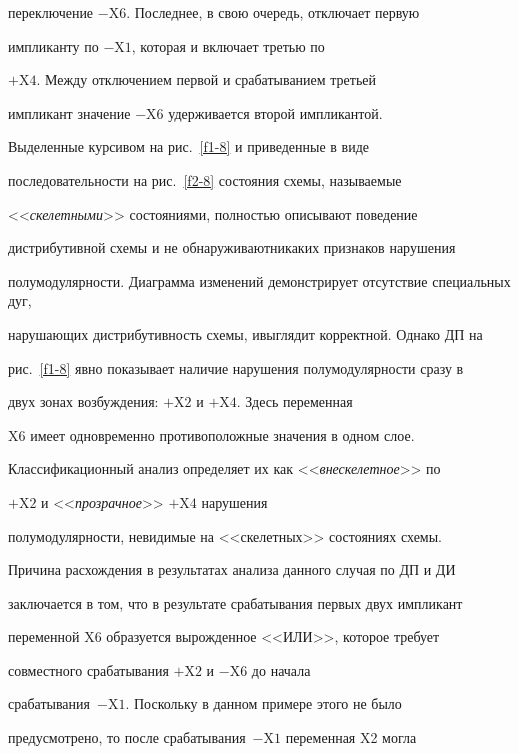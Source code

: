 переключение $-\mathrm{X}6$. Последнее, в свою очередь, отключает первую 


импликанту по $-\mathrm{X}1$, которая и включает третью по 


$+\mathrm{X}4$. Между отключением первой и срабатыванием третьей 


импликант значение $-\mathrm{X}6$ удерживается второй импликантой. 


Выделенные курсивом на рис.~\ref{f1-8} и приведенные в виде 


последовательности на рис.~\ref{f2-8} состояния схемы, называемые 


<<\textit{скелетными}>> состояниями, полностью описывают поведение 


дистрибутивной схемы и не обнаруживают\linebreak никаких признаков нарушения 


полумодулярности. Диаграмма изменений демонстрирует отсутствие специальных дуг, 


нарушающих дистрибутивность схемы, и\linebreak выглядит корректной.  Однако ДП на 


рис.~\ref{f1-8} явно показывает наличие нарушения полумодулярности сразу в 


двух зонах возбуждения: $+\mathrm{X}2$ и $+\mathrm{X}4$. Здесь переменная 


X6 имеет одновременно противоположные значения в одном слое. 


Классификационный анализ определяет их как <<\textit{внескелетное}>>  по 


$+\mathrm{X}2$ и <<\textit{прозрачное}>>  $+\mathrm{X}4$ нарушения 


полумодулярности, невидимые на <<скелетных>>  состояниях схемы. 


      


      Причина расхождения в результатах анализа данного случая по ДП и ДИ 


заключается в том, что в результате срабатывания первых двух импликант 


переменной X6 образуется вырожденное <<ИЛИ>>, которое требует 


совместного срабатывания $+\mathrm{X}2$ и $-\mathrm{X}6$ до начала 


срабатывания~$-\mathrm{X}1$. Поскольку в данном примере этого не было 


предусмотрено, то после срабатывания~$-\mathrm{X}1$ переменная X2 могла 


